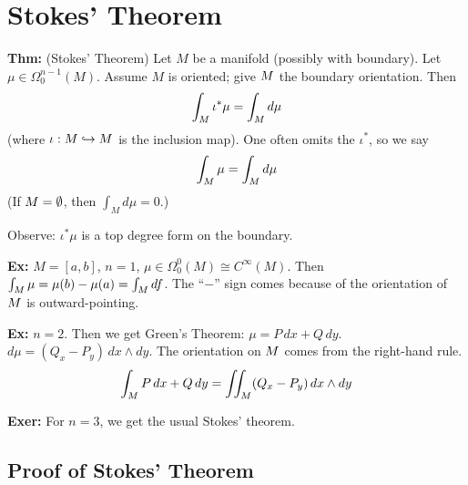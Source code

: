 \documentclass[10pt,letterpaper]{article}
\newcommand{\n}{\hfill\break}
\newcommand{\hangblock}[2]{\par\noindent\settowidth{\hangindent}{\textbf{#1: }}\textbf{#1: }\nolinebreak#2}
\newcommand{\thm}[1]{\hangblock{Thm}{#1}}
\newcommand{\ex}[1]{\hangblock{Ex}{#1}}
\newcommand{\exer}[1]{\hangblock{Exer}{#1}}
\let\d\relax
\newcommand{\d}{\partial}
\begin{document}
\section*{Stokes' Theorem}

\thm{
	(Stokes' Theorem) Let $M$ be a manifold (possibly with boundary). Let $\mu\in\Omega_{0}^{n-1}(M)$. Assume $M$ is oriented; give $\d{}M$ the boundary orientation. Then
	\[
		\int_{\d{}M}\iota^{*}\mu=\int_{M}d\mu
	\]
	(where $\iota:\d{}M\hookrightarrow{}M$ is the inclusion map). One often omits the $\iota^{*}$, so we say
	\[
		\int_{\d{}M}\mu=\int_{M}d\mu
	\]
	(If $\d{}M=\emptyset$, then $\int_{M}d\mu=0$.)\n
}

\par\noindent
Observe: $\iota^{*}\mu$ is a top degree form on the boundary.\n

\ex{
	$M=[a,b]$, $n=1$, $\mu\in\Omega_{0}^{0}(M)\cong{}C^{\infty}(M)$. Then $\int_{\d{}M}\mu=\mu(b)-\mu(a)=\int_{M}df$. The ``$-$'' sign comes because of the orientation of $\d{}M$ is outward-pointing.\n
}

\ex{
	$n=2$. Then we get Green's Theorem:\n
	$\mu=P\,dx+Q\,dy$. $d\mu=(Q_{x}-P_{y})\,dx\wedge{}dy$.\n
	The orientation on $\d{}M$ comes from the right-hand rule.
	\[
		\int_{\d{}M}P\,dx+Q\,dy=\iint_{M}(Q_{x}-P_{y})\,dx\wedge{}dy
	\]
	\n
}

\exer{
	For $n=3$, we get the usual Stokes' theorem.\n
}

\subsection*{Proof of Stokes' Theorem}
\end{document}
